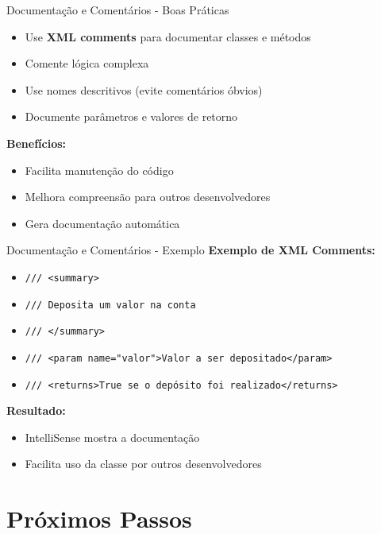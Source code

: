 \documentclass[aspectratio=169]{beamer}
\begin{document}
\begin{frame}{Documentação e Comentários - Boas Práticas}
\begin{itemize}
\item Use \textbf{XML comments} para documentar classes e métodos
\item Comente lógica complexa
\item Use nomes descritivos (evite comentários óbvios)
\item Documente parâmetros e valores de retorno
\end{itemize}

\vspace{0.5cm}
\textbf{Benefícios:}
\begin{itemize}
\item Facilita manutenção do código
\item Melhora compreensão para outros desenvolvedores
\item Gera documentação automática
\end{itemize}
\end{frame}

\begin{frame}{Documentação e Comentários - Exemplo}
\textbf{Exemplo de XML Comments:}
\begin{itemize}
\item \texttt{/// <summary>}
\item \texttt{/// Deposita um valor na conta}
\item \texttt{/// </summary>}
\item \texttt{/// <param name="valor">Valor a ser depositado</param>}
\item \texttt{/// <returns>True se o depósito foi realizado</returns>}
\end{itemize}

\vspace{0.5cm}
\textbf{Resultado:}
\begin{itemize}
\item IntelliSense mostra a documentação
\item Facilita uso da classe por outros desenvolvedores
\end{itemize}
\end{frame}

\section{Próximos Passos}
\end{document}
